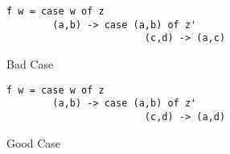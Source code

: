 \documentclass[acmsmall,review]{acmart}
\begin{document}
\begin{figure}[t]
  \begin{minipage}{0.5\textwidth}
\begin{noway}
\begin{lstlisting}
f w = case w of z
        (a,b) -> case (a,b) of z'
                        (c,d) -> (a,c)
\end{lstlisting}
\end{noway}
\vspace{-0.5cm}
\caption{Bad Case\label{fig:badcase}}
\end{minipage}%
\begin{minipage}{0.5\textwidth}
\begin{notyet}
\begin{lstlisting}
f w = case w of z
        (a,b) -> case (a,b) of z'
                        (c,d) -> (a,d)
\end{lstlisting}
\end{notyet}
\vspace{-0.5cm}
\caption{Good Case\label{fig:goodcase}}
\end{minipage}
\end{figure}
\end{document}
